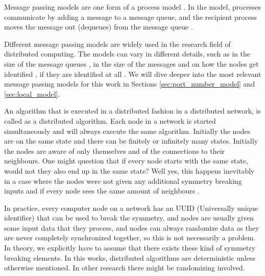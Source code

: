 Message passing models are one form of a process model \cite{DBLP:books/el/leeuwen90/LamportL90}.
In the model, processes communicate by adding a message to a message queue, and the recipient process moves the message out (dequeues) from the message queue \cite{DBLP:books/el/leeuwen90/LamportL90}.

Different message passing models are widely used in the research field of distributed computing.
The models can vary in different details, such as in the size of the message queues \cite{DBLP:books/el/leeuwen90/LamportL90}, in the size of the messages \cite{peleg2000distributed} and on how the nodes get identified \cite{DBLP:conf/focs/Linial87}, if they are identified at all \cite{DBLP:conf/istcs/MayerNS95}.
We will dive deeper into the most relevant message passing models for this work in Sections \ref{sec:port_number_model} and \ref{sec:local_model}.

An algorithm that is executed in a distributed fashion in a distributed network, is called as a distributed algorithm.
Each node in a network is started simultaneously and will always execute the same algorithm.
Initially the nodes are on the same state and there can be finitely or infinitely many states.
Initially the nodes are aware of only themselves and of the connections to their neighbours.
One might question that if every node starts with the same state, would not they also end up in the same state?
Well yes, this happens inevitably in a case where the nodes were not given any additional symmetry breaking inputs and if every node sees the same amount of neighbours \cite{HirvonenSuomelaDistAlg2020}.



In practice, every computer node on a network has an UUID (Universally unique identifier) that can be used to break the symmetry, and nodes are usually given some input data that they process, and nodes can always randomize data as they are never completely synchronized together, so this is not necessarily a problem.
In theory, we explicitly have to assume that there exists these kind of symmetry breaking elements.
In this works, distributed algorithms are deterministic unless otherwise mentioned.
In other research there might be randomizing involved.



